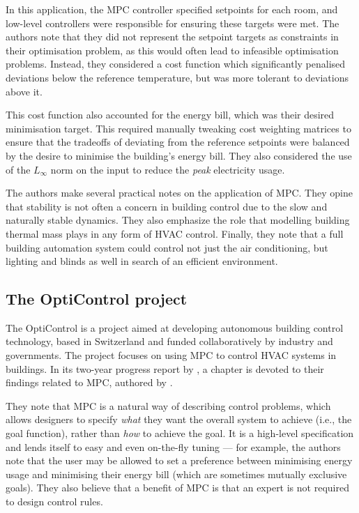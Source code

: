 In this application, the MPC controller specified setpoints for each room, and low-level controllers were responsible for ensuring these targets were met.
The authors note that they did not represent the setpoint targets as constraints in their optimisation problem, as this would often lead to infeasible optimisation problems.
Instead, they considered a cost function which significantly penalised deviations below the reference temperature, but was more tolerant to deviations above it.

This cost function also accounted for the energy bill, which was their desired minimisation target.
This required manually tweaking cost weighting matrices to ensure that the tradeoffs of deviating from the reference setpoints were balanced by the desire to minimise the building's energy bill.
They also considered the use of the $L_\infty$ norm on the input to reduce the \emph{peak} electricity usage.

The authors make several practical notes on the application of MPC\@.
They opine that stability is not often a concern in building control due to the slow and naturally stable dynamics.
They also emphasize the role that modelling building thermal mass plays in any form of HVAC control.
Finally, they note that a full building automation system could control not just the air conditioning, but lighting and blinds as well in search of an efficient environment.

\subsection{The OptiControl project}

The OptiControl is a project aimed at developing autonomous building control technology, based in Switzerland and funded collaboratively by industry and governments.
The project focuses on using MPC to control HVAC systems in buildings.
In its two-year progress report by \textcite{Gyalistras10}, a chapter is devoted to their findings related to MPC, authored by \textcite{Oldewurtel10}.

They note that MPC is a natural way of describing control problems, which allows designers to specify \emph{what} they want the overall system to achieve (i.e., the goal function), rather than \emph{how} to achieve the goal.
It is a high-level specification\footnotemark{} and lends itself to easy and even on-the-fly tuning --- for example, the authors note that the user may be allowed to set a preference between minimising energy usage and minimising their energy bill (which are sometimes mutually exclusive goals).
They also believe that a benefit of MPC is that an expert is not required to design control rules.

